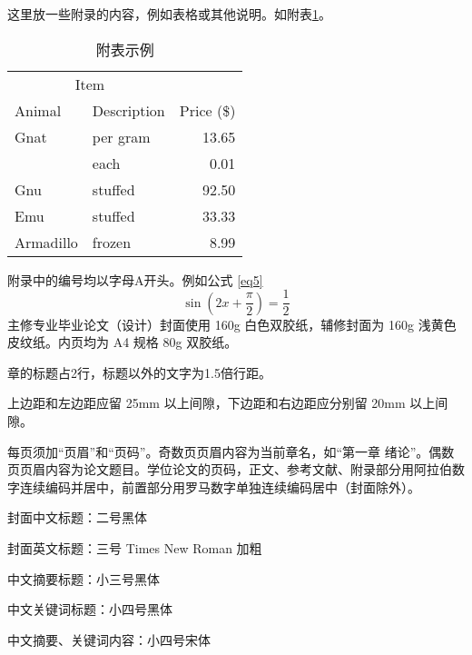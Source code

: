 \documentclass{xmu}
\begin{document}
\begin{appendix}
    这里放一些附录的内容，例如表格或其他说明。如附表\ref{atable}。
    \begin{table}[!htb]
        \centering
        \caption{附表示例}
        \label{atable}
        \begin{tabular}{llr}
            \hline
            \multicolumn{2}{c}{Item} &                          \\ \cline{1-2}
            Animal                   & Description & Price (\$) \\ \hline
            Gnat                     & per gram    & 13.65      \\
                                     & each        & 0.01       \\
            Gnu                      & stuffed     & 92.50      \\
            Emu                      & stuffed     & 33.33      \\
            Armadillo                & frozen      & 8.99       \\ \hline
        \end{tabular}
    \end{table}
    附录中的编号均以字母A开头。例如公式 \ref{eq5}
    \begin{equation}\label{eq5}
        \sin \left(2x+\frac\pi2\right)=\frac 12
    \end{equation}
    主修专业毕业论文（设计）封面使用 160g 白色双胶纸，辅修封面为 160g 浅黄色皮纹纸。内页均为 A4 规格 80g 双胶纸。\par
    章的标题占2行，标题以外的文字为1.5倍行距。\par
    上边距和左边距应留 25mm 以上间隙，下边距和右边距应分别留 20mm 以上间隙。\par
    每页须加“页眉”和“页码”。奇数页页眉内容为当前章名，如“第一章 绪论”。偶数页页眉内容为论文题目。学位论文的页码，正文、参考文献、附录部分用阿拉伯数字连续编码并居中，前置部分用罗马数字单独连续编码居中（封面除外）。\par
    封面中文标题：二号黑体\par
    封面英文标题：三号 Times New Roman 加粗\par
    中文摘要标题：小三号黑体\par
    中文关键词标题：小四号黑体\par
    中文摘要、关键词内容：小四号宋体\par

\end{appendix}
\end{document}
